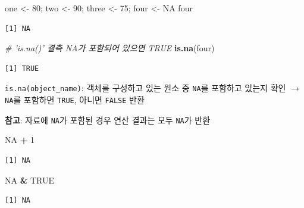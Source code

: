 \documentclass[
  11pt,
]{krantz}
\newenvironment{Shaded}{\begin{snugshade}}{\end{snugshade}}
\newcommand{\CommentTok}[1]{\textcolor[rgb]{0.37,0.37,0.37}{\textit{#1}}}
\newcommand{\DecValTok}[1]{\textcolor[rgb]{0.06,0.06,0.06}{#1}}
\newcommand{\KeywordTok}[1]{\textcolor[rgb]{0.27,0.27,0.27}{\textbf{#1}}}
\newcommand{\NormalTok}[1]{#1}
\newcommand{\OperatorTok}[1]{\textcolor[rgb]{0.43,0.43,0.43}{\textbf{#1}}}
\newcommand{\OtherTok}[1]{\textcolor[rgb]{0.37,0.37,0.37}{#1}}
\newcommand{\StringTok}[1]{\textcolor[rgb]{0.5,0.5,0.5}{#1}}
\let\BeginKnitrBlock\begin \let\EndKnitrBlock\end
\begin{document}
\begin{Shaded}
\begin{Highlighting}[]
\NormalTok{one <-}\StringTok{ }\DecValTok{80}\NormalTok{; two <-}\StringTok{ }\DecValTok{90}\NormalTok{; three <-}\StringTok{ }\DecValTok{75}\NormalTok{; four <-}\StringTok{ }\OtherTok{NA}
\NormalTok{four}
\end{Highlighting}
\end{Shaded}

\begin{verbatim}
[1] NA
\end{verbatim}

\begin{Shaded}
\begin{Highlighting}[]
\CommentTok{# 'is.na()' 결측 NA가 포함되어 있으면 TRUE }
\KeywordTok{is.na}\NormalTok{(four)}
\end{Highlighting}
\end{Shaded}

\begin{verbatim}
[1] TRUE
\end{verbatim}

\normalsize

\footnotesize

\BeginKnitrBlock{rmdtip}
\texttt{is.na(object\_name)}: 객체를 구성하고 있는 원소 중 \texttt{NA}를 포함하고 있는지 확인 \(\rightarrow\) \texttt{NA}를 포함하면 \texttt{TRUE}, 아니면 \texttt{FALSE} 반환

\textbf{참고}: 자료에 \texttt{NA}가 포함된 경우 연산 결과는 모두 \texttt{NA}가 반환
\EndKnitrBlock{rmdtip}

\normalsize

\footnotesize

\begin{Shaded}
\begin{Highlighting}[]
\OtherTok{NA} \OperatorTok{+}\StringTok{ }\DecValTok{1}
\end{Highlighting}
\end{Shaded}

\begin{verbatim}
[1] NA
\end{verbatim}

\begin{Shaded}
\begin{Highlighting}[]
\OtherTok{NA} \OperatorTok{&}\StringTok{ }\OtherTok{TRUE}
\end{Highlighting}
\end{Shaded}

\begin{verbatim}
[1] NA
\end{verbatim}
\end{document}
